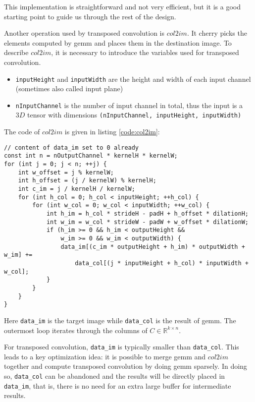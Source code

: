 This implementation is straightforward and not very efficient, but it is a good starting point to guide
us through the rest of the design.

Another operation used by transposed convolution is $col2im$. It cherry picks the elements computed by
\gls{gemm} and places them in the destination image. To describe $col2im$, it is necessary to introduce
the variables used for transposed convolution.

\begin{itemize}
  \item \texttt{inputHeight} and \texttt{inputWidth} are the height and width of each input
    channel (sometimes also called input plane)
  \item \texttt{nInputChannel} is the number of input channel in total, thus the input is a
    $3D$ tensor with dimensions \texttt{(nInputChannel, inputHeight, inputWidth)}
\end{itemize}

The code of $col2im$ is given in listing \ref{code:col2im}:

\begin{code}
\begin{verbatim}
// content of data_im set to 0 already
const int n = nOutputChannel * kernelH * kernelW;
for (int j = 0; j < n; ++j) {
    int w_offset = j % kernelW;
    int h_offset = (j / kernelW) % kernelH;
    int c_im = j / kernelH / kernelW;
    for (int h_col = 0; h_col < inputHeight; ++h_col) {
        for (int w_col = 0; w_col < inputWidth; ++w_col) {
            int h_im = h_col * strideH - padH + h_offset * dilationH;
            int w_im = w_col * strideW - padW + w_offset * dilationW;
            if (h_im >= 0 && h_im < outputHeight &&
                w_im >= 0 && w_im < outputWidth) {
                data_im[(c_im * outputHeight + h_im) * outputWidth + w_im] +=
                    data_col[(j * inputHeight + h_col) * inputWidth + w_col];
            }
        }
    }
}
\end{verbatim}
\label{code:col2im}
\end{code}

Here \texttt{data_im} is the target image while \texttt{data_col} is the result of \gls{gemm}.
The outermost loop iterates through the columns of $C \in \mathbb{R}^{k \times n}$.

For transposed convolution, \texttt{data_im} is typically smaller than
\texttt{data_col}. This leads to a key optimization idea: it is possible to merge \gls{gemm} and
$col2im$ together and compute transposed convolution by doing \gls{gemm} sparsely. In doing so,
\texttt{data_col} can be abandoned and the results will be directly placed in \texttt{data_im},
that is, there is no need for an extra large buffer for intermediate results.

